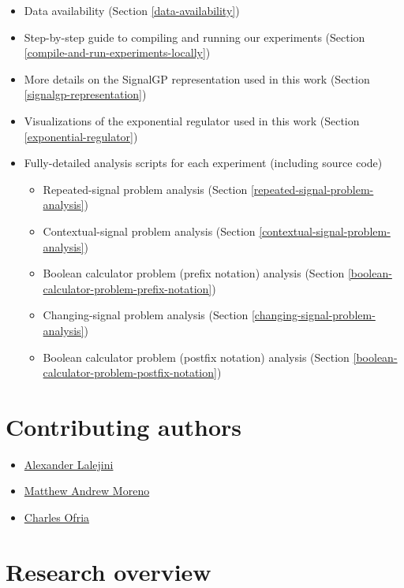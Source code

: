 \documentclass[
]{book}
\providecommand{\tightlist}{%
  \setlength{\itemsep}{0pt}\setlength{\parskip}{0pt}}
\begin{document}
\begin{itemize}
\tightlist
\item
  Data availability (Section \ref{data-availability})
\item
  Step-by-step guide to compiling and running our experiments (Section \ref{compile-and-run-experiments-locally})
\item
  More details on the SignalGP representation used in this work (Section \ref{signalgp-representation})
\item
  Visualizations of the exponential regulator used in this work (Section \ref{exponential-regulator})
\item
  Fully-detailed analysis scripts for each experiment (including source code)

  \begin{itemize}
  \tightlist
  \item
    Repeated-signal problem analysis (Section \ref{repeated-signal-problem-analysis})
  \item
    Contextual-signal problem analysis (Section \ref{contextual-signal-problem-analysis})
  \item
    Boolean calculator problem (prefix notation) analysis (Section \ref{boolean-calculator-problem-prefix-notation})
  \item
    Changing-signal problem analysis (Section \ref{changing-signal-problem-analysis})
  \item
    Boolean calculator problem (postfix notation) analysis (Section \ref{boolean-calculator-problem-postfix-notation})
  \end{itemize}
\end{itemize}

\hypertarget{contributing-authors}{%
\section{Contributing authors}\label{contributing-authors}}

\begin{itemize}
\tightlist
\item
  \href{https://lalejini.com/}{Alexander Lalejini}
\item
  \href{http://mmore500.com/}{Matthew Andrew Moreno}
\item
  \href{https://ofria.com/}{Charles Ofria}
\end{itemize}

\hypertarget{research-overview}{%
\section{Research overview}\label{research-overview}}
\end{document}
